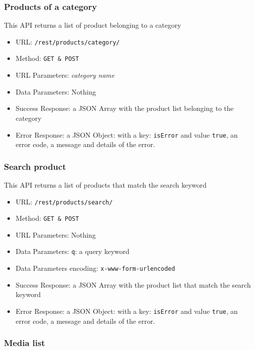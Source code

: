 \subsubsection*{Products of a category}

This API returns a list of product belonging to a category

\begin{itemize}
    \item URL: \texttt{/rest/products/category/}
    \item Method: \texttt{GET \& POST}
    \item URL Parameters: \textit{category name}
    \item Data Parameters: Nothing
    \item Success Response: a JSON Array with the product list  belonging to the category
    \item Error Response: a JSON Object: with a key: \texttt{isError}  and value \texttt{true}, an error code, a message and details of the error.
\end{itemize}

\subsubsection*{Search product}

This API returns a list of products that match the search keyword

\begin{itemize}
    \item URL: \texttt{/rest/products/search/}
    \item Method: \texttt{GET \& POST}
    \item URL Parameters: Nothing
    \item Data Parameters: \texttt{q}: a query keyword
    \item Data Parameters encoding: \texttt{x-www-form-urlencoded}
    \item Success Response: a JSON Array with the product list  that match the search keyword
    \item Error Response: a JSON Object: with a key: \texttt{isError}  and value \texttt{true}, an error code, a message and details of the error.
\end{itemize}

\subsubsection*{Media list}

